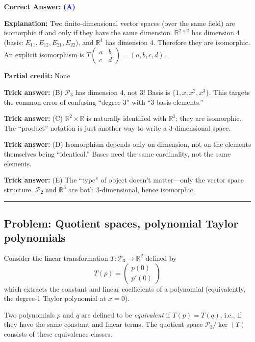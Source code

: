\documentclass[12pt]{amsart}
\newcommand{\divider}{
  \vspace{-1em}
  \noindent
  \raisebox{-0.15ex}{\textbullet}%
  \hspace{0.5em}%
  \rule[0.5ex]{0.95\textwidth}{1.0pt}%
  \hspace{0.5em}%
  \raisebox{-0.15ex}{\textbullet}%
  \vspace{0em}
}
\begin{document}
\textbf{Correct Answer:} \textcolor{blue}{\textbf{(A)}}

\textbf{Explanation:} Two finite-dimensional vector spaces (over the same field) are isomorphic if and only if they have the same dimension. $\mathbb{R}^{2 \times 2}$ has dimension 4 (basis: $E_{11}, E_{12}, E_{21}, E_{22}$), and $\mathbb{R}^4$ has dimension 4. Therefore they are isomorphic. An explicit isomorphism is $T\begin{pmatrix} a & b \\ c & d \end{pmatrix} = (a, b, c, d)$.

\textbf{Partial credit:} None

\textbf{Trick answer:} (B) $\mathcal{P}_3$ has dimension 4, not 3! Basis is $\{1, x, x^2, x^3\}$. This targets the common error of confusing ``degree 3'' with ``3 basis elements.''

\textbf{Trick answer:} (C) $\mathbb{R}^2 \times \mathbb{R}$ is naturally identified with $\mathbb{R}^3$; they are isomorphic. The ``product'' notation is just another way to write a 3-dimensional space.

\textbf{Trick answer:} (D) Isomorphism depends only on dimension, not on the elements themselves being ``identical.'' Bases need the same cardinality, not the same elements.

\textbf{Trick answer:} (E) The ``type'' of object doesn't matter—only the vector space structure. $\mathcal{P}_2$ and $\mathbb{R}^3$ are both 3-dimensional, hence isomorphic.

\divider

\subsection*{Problem: Quotient spaces, polynomial Taylor polynomials}

Consider the linear transformation $T: \mathcal{P}_3 \to \mathbb{R}^2$ defined by
$$T(p) = \begin{pmatrix} p(0) \\ p'(0) \end{pmatrix}$$
which extracts the constant and linear coefficients of a polynomial (equivalently, the degree-1 Taylor polynomial at $x = 0$).

Two polynomials $p$ and $q$ are defined to be \emph{equivalent} if $T(p) = T(q)$, i.e., if they have the same constant and linear terms. The quotient space $\mathcal{P}_3 / \ker(T)$ consists of these equivalence classes.
\end{document}
